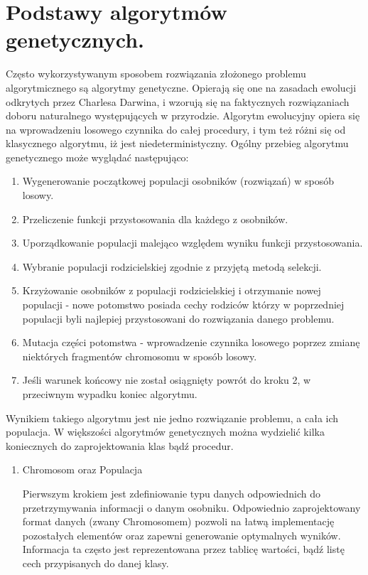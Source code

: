 \section{Podstawy algorytmów genetycznych.}
\begin{par}
Często wykorzystywanym sposobem rozwiązania złożonego problemu algorytmicznego są algorytmy genetyczne.
Opierają się one na zasadach ewolucji odkrytych przez Charlesa Darwina, i wzorują się na faktycznych rozwiązaniach doboru naturalnego występujących w przyrodzie.
Algorytm ewolucyjny opiera się na wprowadzeniu losowego czynnika do całej procedury, i tym też różni się od klasycznego algorytmu, iż jest niedeterministyczny. 
Ogólny przebieg algorytmu genetycznego może wyglądać następująco:
\begin{enumerate}
\item Wygenerowanie początkowej populacji osobników (rozwiązań) w sposób losowy.
\item Przeliczenie funkcji przystosowania dla każdego z osobników.
\item Uporządkowanie populacji malejąco względem wyniku funkcji przystosowania.
\item Wybranie populacji rodzicielskiej zgodnie z przyjętą metodą selekcji.
\item Krzyżowanie osobników z populacji rodzicielskiej i otrzymanie nowej populacji - nowe potomstwo posiada cechy rodziców którzy w poprzedniej populacji byli najlepiej przystosowani do rozwiązania danego problemu.
\item Mutacja części potomstwa - wprowadzenie czynnika losowego poprzez zmianę niektórych fragmentów chromosomu w sposób losowy.
\item Jeśli warunek końcowy nie został osiągnięty powrót do kroku 2, w przeciwnym wypadku koniec algorytmu.
\end{enumerate}
Wynikiem takiego algorytmu jest nie jedno rozwiązanie problemu, a cała ich populacja.
W większości algorytmów genetycznych można wydzielić kilka koniecznych do zaprojektowania klas bądź procedur.
\begin{enumerate}
\item Chromosom oraz Populacja
	\begin{par}
		Pierwszym krokiem jest zdefiniowanie typu danych odpowiednich do przetrzymywania informacji o danym osobniku.
		Odpowiednio zaprojektowany format danych (zwany Chromosomem) pozwoli na łatwą implementację pozostałych elementów oraz zapewni generowanie optymalnych wyników.
		Informacja ta często jest reprezentowana przez tablicę wartości, bądź listę cech przypisanych do danej klasy. 

\end{par}
\end{enumerate}
\end{par}
